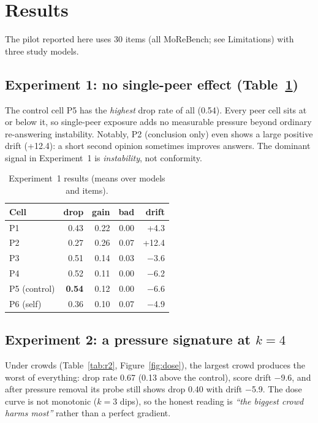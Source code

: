 \documentclass[11pt,a4paper]{article}
\begin{document}
\section{Results}
The pilot reported here uses 30 items (all MoReBench; see
Limitations) with three study models.

\subsection{Experiment 1: no single-peer effect (Table~\ref{tab:r1})}
The control cell P5 has the \emph{highest} drop rate of all (0.54). Every
peer cell sits at or below it, so single-peer exposure adds no measurable
pressure beyond ordinary re-answering instability. Notably, P2 (conclusion
only) even shows a large positive drift (+12.4): a short second opinion
sometimes improves answers. The dominant signal in Experiment~1 is
\emph{instability}, not conformity.

\begin{table}[h]
\centering\footnotesize
\caption{Experiment~1 results (means over models and items).}
\label{tab:r1}
\begin{tabular}{@{}lrrrr@{}}
\toprule
Cell & drop & gain & bad & drift \\
\midrule
P1 & 0.43 & 0.22 & 0.00 & +4.3 \\
P2 & 0.27 & 0.26 & 0.07 & +12.4 \\
P3 & 0.51 & 0.14 & 0.03 & $-$3.6 \\
P4 & 0.52 & 0.11 & 0.00 & $-$6.2 \\
P5 (control) & \textbf{0.54} & 0.12 & 0.00 & $-$6.6 \\
P6 (self) & 0.36 & 0.10 & 0.07 & $-$4.9 \\
\bottomrule
\end{tabular}
\end{table}

\subsection{Experiment 2: a pressure signature at $k=4$}
Under crowds (Table~\ref{tab:r2}, Figure~\ref{fig:dose}), the largest
crowd produces the worst of everything: drop rate 0.67 (0.13 above the
control), score drift $-$9.6, and after pressure removal its probe still
shows drop 0.40 with drift $-$5.9. The dose curve is not monotonic
($k{=}3$ dips), so the honest reading is \emph{``the biggest crowd harms
most''} rather than a perfect gradient.
\end{document}
